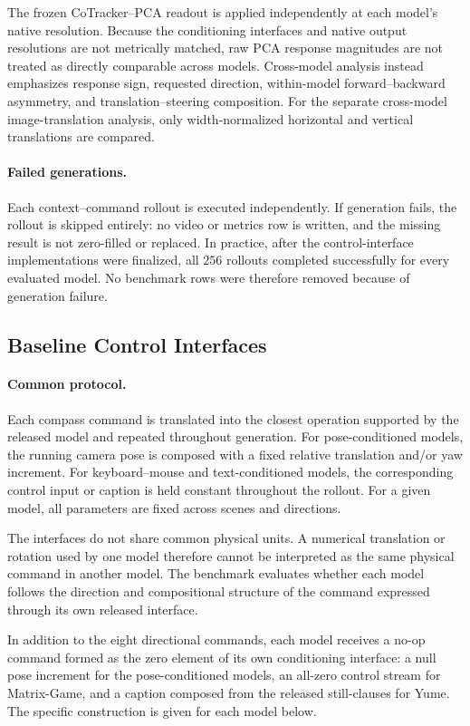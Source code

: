 The frozen CoTracker--PCA readout is applied independently at each model's
native resolution. Because the conditioning interfaces and native output
resolutions are not metrically matched, raw PCA response magnitudes are not
treated as directly comparable across models. Cross-model analysis instead
emphasizes response sign, requested direction, within-model
forward--backward asymmetry, and translation--steering composition. For the
separate cross-model image-translation analysis, only width-normalized
horizontal and vertical translations are compared.

\paragraph{Failed generations.}
Each context--command rollout is executed independently. If generation fails,
the rollout is skipped entirely: no video or metrics row is written, and the
missing result is not zero-filled or replaced. In practice, after the
control-interface implementations were finalized, all $256$ rollouts
completed successfully for every evaluated model. No benchmark rows were
therefore removed because of generation failure.


\subsection{Baseline Control Interfaces}
\label{app:baseline_controls}

\paragraph{Common protocol.}
Each compass command is translated into the closest operation supported by the
released model and repeated throughout generation. For pose-conditioned
models, the running camera pose is composed with a fixed relative translation
and/or yaw increment. For keyboard--mouse and text-conditioned models, the
corresponding control input or caption is held constant throughout the
rollout. For a given model, all parameters are fixed across scenes and
directions.

The interfaces do not share common physical units. A numerical translation or
rotation used by one model therefore cannot be interpreted as the same
physical command in another model. The benchmark evaluates whether each model
follows the direction and compositional structure of the command expressed
through its own released interface.

In addition to the eight directional commands, each model receives a no-op
command formed as the zero element of its own conditioning interface: a null
pose increment for the pose-conditioned models, an all-zero control stream for
Matrix-Game, and a caption composed from the released still-clauses for Yume.
The specific construction is given for each model below.

